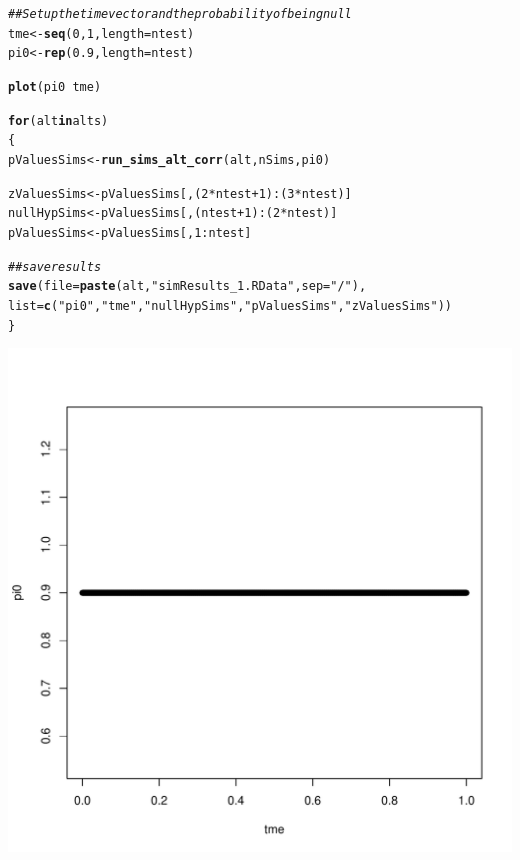 \documentclass{article}\usepackage[]{graphicx}\usepackage[]{color}
\makeatletter
\def\maxwidth{ %
  \ifdim\Gin@nat@width>\linewidth
    \linewidth
  \else
    \Gin@nat@width
  \fi
}
\newcommand{\hlnum}[1]{\textcolor[rgb]{0.686,0.059,0.569}{#1}}%
\newcommand{\hlstr}[1]{\textcolor[rgb]{0.192,0.494,0.8}{#1}}%
\newcommand{\hlcom}[1]{\textcolor[rgb]{0.678,0.584,0.686}{\textit{#1}}}%
\newcommand{\hlopt}[1]{\textcolor[rgb]{0,0,0}{#1}}%
\newcommand{\hlstd}[1]{\textcolor[rgb]{0.345,0.345,0.345}{#1}}%
\newcommand{\hlkwa}[1]{\textcolor[rgb]{0.161,0.373,0.58}{\textbf{#1}}}%
\newcommand{\hlkwb}[1]{\textcolor[rgb]{0.69,0.353,0.396}{#1}}%
\newcommand{\hlkwc}[1]{\textcolor[rgb]{0.333,0.667,0.333}{#1}}%
\newcommand{\hlkwd}[1]{\textcolor[rgb]{0.737,0.353,0.396}{\textbf{#1}}}%
\newenvironment{kframe}{%
 \def\at@end@of@kframe{}%
 \ifinner\ifhmode%
  \def\at@end@of@kframe{\end{minipage}}%
  \begin{minipage}{\columnwidth}%
 \fi\fi%
 \def\FrameCommand##1{\hskip\@totalleftmargin \hskip-\fboxsep
 \colorbox{shadecolor}{##1}\hskip-\fboxsep
     \hskip-\linewidth \hskip-\@totalleftmargin \hskip\columnwidth}%
 \MakeFramed {\advance\hsize-\width
   \@totalleftmargin\z@ \linewidth\hsize
   \@setminipage}}%
 {\par\unskip\endMakeFramed%
 \at@end@of@kframe}
\newenvironment{knitrout}{}{} %
\makeatother
\begin{document}
\begin{knitrout}
\color{fgcolor}\begin{kframe}
\begin{alltt}
\hlcom{## Set up the time vector and the probability of being null}
\hlstd{tme} \hlkwb{<-} \hlkwd{seq}\hlstd{(}\hlnum{0}\hlstd{,}\hlnum{1}\hlstd{,} \hlkwc{length}\hlstd{=ntest)}
\hlstd{pi0} \hlkwb{<-} \hlkwd{rep}\hlstd{(}\hlnum{0.9}\hlstd{,} \hlkwc{length}\hlstd{=ntest)}

\hlkwd{plot}\hlstd{(pi0} \hlopt{~} \hlstd{tme)}

\hlkwa{for}\hlstd{(alt} \hlkwa{in} \hlstd{alts)}
\hlstd{\{}
  \hlstd{pValuesSims} \hlkwb{<-} \hlkwd{run_sims_alt_corr}\hlstd{(alt, nSims, pi0)}

  \hlstd{zValuesSims} \hlkwb{<-} \hlstd{pValuesSims[,(}\hlnum{2}\hlopt{*}\hlstd{ntest}\hlopt{+}\hlnum{1}\hlstd{)}\hlopt{:}\hlstd{(}\hlnum{3}\hlopt{*}\hlstd{ntest)]}
  \hlstd{nullHypSims} \hlkwb{<-} \hlstd{pValuesSims[,(ntest}\hlopt{+}\hlnum{1}\hlstd{)}\hlopt{:}\hlstd{(}\hlnum{2}\hlopt{*}\hlstd{ntest)]}
  \hlstd{pValuesSims} \hlkwb{<-} \hlstd{pValuesSims[,}\hlnum{1}\hlopt{:}\hlstd{ntest]}

  \hlcom{##save results}
  \hlkwd{save}\hlstd{(}\hlkwc{file}\hlstd{=}\hlkwd{paste}\hlstd{(alt,} \hlstr{"simResults_1.RData"}\hlstd{,}\hlkwc{sep}\hlstd{=}\hlstr{"/"}\hlstd{),}
       \hlkwc{list}\hlstd{=}\hlkwd{c}\hlstd{(}\hlstr{"pi0"}\hlstd{,} \hlstr{"tme"}\hlstd{,} \hlstr{"nullHypSims"}\hlstd{,}\hlstr{"pValuesSims"}\hlstd{,}\hlstr{"zValuesSims"}\hlstd{))}
\hlstd{\}}
\end{alltt}
\end{kframe}

{\centering \includegraphics[width=\maxwidth]{Figures/I-1} 

}



\end{knitrout}
\end{document}
